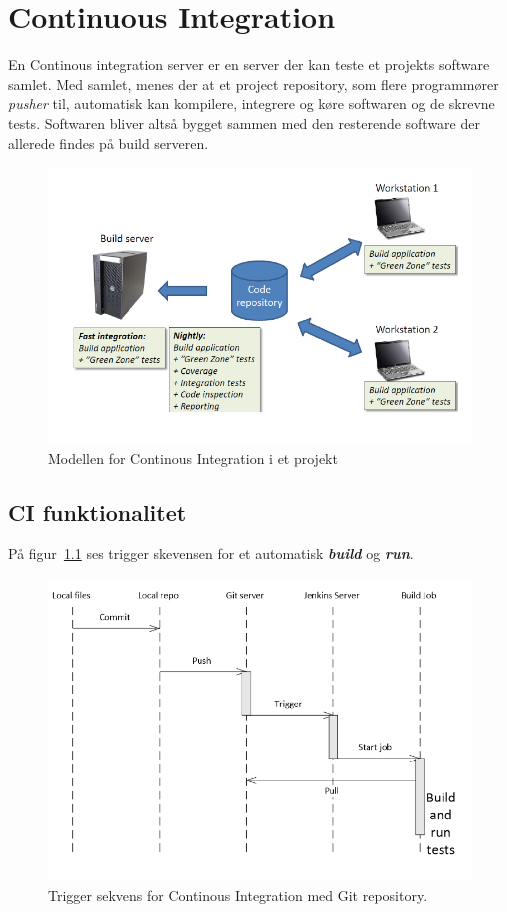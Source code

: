 \section{Continuous Integration}
En Continous integration server er  en server der kan teste et projekts software samlet.
Med samlet, menes der at et project repository, som flere programmører \textit{pusher} til, automatisk kan kompilere, integrere og køre softwaren og de skrevne tests. Softwaren bliver altså bygget sammen med den resterende software der allerede findes på build serveren.

\begin{figure}[H]
\centering
\includegraphics[width=0.7\linewidth]{figs/ciArch.PNG}
\caption{Modellen for Continous Integration i et projekt}
\label{fig:ciArch}
\end{figure}

\subsection{CI funktionalitet}
På figur~\ref{} ses trigger skevensen for et automatisk \textit{\textbf{build}} og \textit{\textbf{run}}.

\begin{figure}[H]
\centering
\includegraphics[width=0.7\linewidth]{figs/ciTriggerSeq.PNG}
\caption{Trigger sekvens for Continous Integration med Git repository.}
\label{fig:ciTriggerSeq}
\end{figure}


